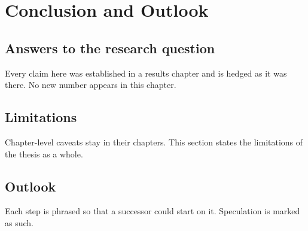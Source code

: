 \chapter{Conclusion and Outlook}
\label{ch:conclusion}


\section{Answers to the research question}
\label{sec:ch9-answers}

 Every claim here was established in a results chapter and is hedged as it
was there. No new number appears in this chapter.

\section{Limitations}
\label{sec:ch9-limitations}

 Chapter-level caveats stay in their
chapters. This section states the limitations of the thesis as a whole.

\section{Outlook}
\label{sec:ch9-outlook}

 Each step is
phrased so that a successor could start on it. Speculation is marked as such.
